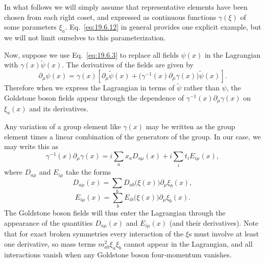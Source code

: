 In what follows we will simply assume that representative elements have been chosen from each right coset, and expressed as continuous functions $\gamma(\xi)$ of some parameters $\xi_a$. Eq.~\eqref{eq:19.6.12} in general provides one explicit example, but we will not limit ourselves to this parameterization.

Now, suppose we use Eq.~\eqref{eq:19.6.3} to replace all fields $\psi(x)$ in the Lagrangian with $\gamma(x)\widetilde\psi(x)$. The derivatives of the fields are given by
\begin{equation}
\partial_\mu\psi(x)
=\gamma(x)\left[
\partial_\mu\widetilde\psi(x)
+\bigl(\gamma^{-1}(x)\partial_\mu\gamma(x)\bigr)
\widetilde\psi(x)\right].
\tag{19.6.13}\label{eq:19.6.13}
\end{equation}
Therefore when we express the Lagrangian in terms of $\widetilde\psi$ rather than $\psi$, the Goldstone boson fields appear through the dependence of $\gamma^{-1}(x)\partial_\mu\gamma(x)$ on $\xi_a(x)$ and its derivatives.

Any variation of a group element like $\gamma(x)$ may be written as the group element times a linear combination of the generators of the group. In our case, we may write this as
\begin{equation}
\gamma^{-1}(x)\partial_\mu\gamma(x)
=i\sum_a x_aD_{a\mu}(x)+i\sum_i t_iE_{i\mu}(x),
\tag{19.6.14}\label{eq:19.6.14}
\end{equation}
where $D_{a\mu}$ and $E_{i\mu}$ take the forms
\begin{equation}
D_{a\mu}(x)=\sum_bD_{ab}\bigl(\xi(x)\bigr)\partial_\mu\xi_b(x),
\tag{19.6.15}\label{eq:19.6.15}
\end{equation}
\begin{equation}
E_{i\mu}(x)=\sum_bE_{ib}\bigl(\xi(x)\bigr)\partial_\mu\xi_b(x).
\tag{19.6.16}\label{eq:19.6.16}
\end{equation}
The Goldstone boson fields will thus enter the Lagrangian through the appearance of the quantities $D_{a\mu}(x)$ and $E_{i\mu}(x)$ (and their derivatives). Note that for exact broken symmetries every interaction of the $\xi$s must involve at least one derivative, so mass terms $m^2_{ab}\xi_a\xi_b$ cannot appear in the Lagrangian, and all interactions vanish when any Goldstone boson four-momentum vanishes.

